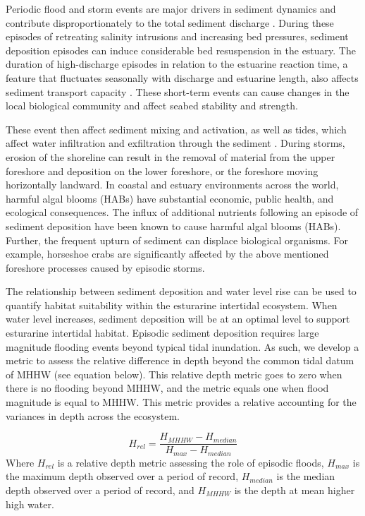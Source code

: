 \documentclass[
]{book}
\begin{document}
Periodic flood and storm events are major drivers in sediment dynamics and contribute disproportionately to the total sediment discharge \citep{ralston_sediment_2013}. During these episodes of retreating salinity intrusions and increasing bed pressures, sediment deposition episodes can induce considerable bed resuspension in the estuary. The duration of high-discharge episodes in relation to the estuarine reaction time, a feature that fluctuates seasonally with discharge and estuarine length, also affects sediment transport capacity \citep{palinkas_sediment_2014}. These short-term events can cause changes in the local biological community and affect seabed stability and strength.

These event then affect sediment mixing and activation, as well as tides, which affect water infiltration and exfiltration through the sediment \citep{nancy_jackson_armoring_2010}. During storms, erosion of the shoreline can result in the removal of material from the upper foreshore and deposition on the lower foreshore, or the foreshore moving horizontally landward. In coastal and estuary environments across the world, harmful algal blooms (HABs) have substantial economic, public health, and ecological consequences. The influx of additional nutrients following an episode of sediment deposition have been known to cause harmful algal blooms (HABs)\citep{ralston_temperature_2014}. Further, the frequent upturn of sediment can displace biological organisms. For example, horseshoe crabs are significantly affected by the above mentioned foreshore processes caused by episodic storms.

The relationship between sediment deposition and water level rise can be used to quantify habitat suitability within the esturarine intertidal ecosystem. When water level increases, sediment deposition will be at an optimal level to support esturarine intertidal habitat. Episodic sediment deposition requires large magnitude flooding events beyond typical tidal inundation. As such, we develop a metric to assess the relative difference in depth beyond the common tidal datum of MHHW (see equation below). This relative depth metric goes to zero when there is no flooding beyond MHHW, and the metric equals one when flood magnitude is equal to MHHW. This metric provides a relative accounting for the variances in depth across the ecosystem.

\[H_{rel} = \frac{H_{MHHW} - H_{median}}{H_{max} - H_{median}}\]
Where \(H_{rel}\) is a relative depth metric assessing the role of episodic floods, \(H_{max}\) is the maximum depth observed over a period of record, \(H_{median}\) is the median depth observed over a period of record, and \(H_{MHHW}\) is the depth at mean higher high water.
\end{document}
